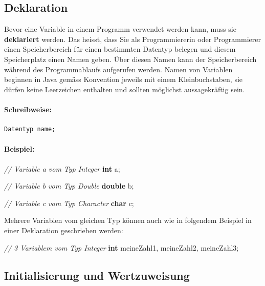 \documentclass[10pt,paper=17cm:22cm, twoside=true, DIV=14]{scrbook}
\newenvironment {Shaded}
        {\begin{mdframed}[style=code] }
         {\end{mdframed}}
\newcommand{\DataTypeTok}[1]{\textcolor[rgb]{0.1,0.1,0.1}{\textbf{#1}}}
\newcommand{\CommentTok}[1]{\textcolor[RGB]{128,128,128}{\textit{#1}}}
\newcommand{\NormalTok}[1]{#1}
\begin{document}
\subsection{Deklaration}\label{deklaration}

Bevor eine Variable in einem Programm verwendet werden kann, muss sie
\textbf{deklariert} werden. Das heisst, dass Sie als Programmiererin
oder Programmierer einen Speicherbereich für einen bestimmten Datentyp
belegen und diesem Speicherplatz einen Namen geben. Über diesen Namen
kann der Speicherbereich während des Programmablaufs aufgerufen werden.
Namen von Variablen beginnen in Java gemäss Konvention jeweils mit einem
Kleinbuchstaben, sie dürfen keine Leerzeichen enthalten und sollten
möglichst aussagekräftig sein.

\paragraph{Schreibweise:}\label{schreibweise}

\begin{verbatim}
Datentyp name;
\end{verbatim}

\paragraph{Beispiel:}\label{beispiel}

\begin{Shaded}
\begin{Highlighting}[]
\CommentTok{// Variable a vom Typ Integer}
\DataTypeTok{int} \NormalTok{a;}

\CommentTok{// Variable b vom Typ Double}
\DataTypeTok{double} \NormalTok{b;}

\CommentTok{// Variable c vom Typ Character}
\DataTypeTok{char} \NormalTok{c;}
\end{Highlighting}
\end{Shaded}

Mehrere Variablen vom gleichen Typ können auch wie in folgendem Beispiel
in einer Deklaration geschrieben werden:

\begin{Shaded}
\begin{Highlighting}[]
\CommentTok{// 3 Variablem vom Typ Integer}
\DataTypeTok{int} \NormalTok{meineZahl1, meineZahl2, meineZahl3;}
\end{Highlighting}
\end{Shaded}

\subsection{Initialisierung und
Wertzuweisung}\label{initialisierung-und-wertzuweisung}
\end{document}
